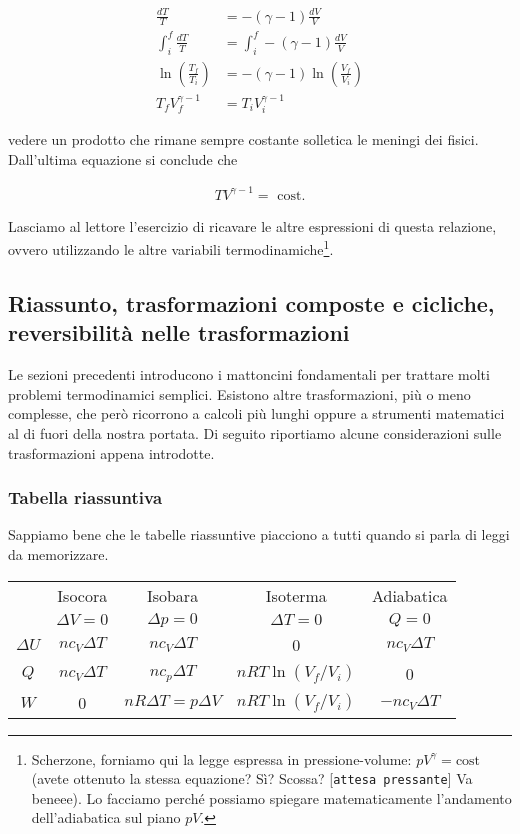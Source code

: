 \begin{align*}
    \frac{dT}{T} &= -(\gamma - 1)\frac{dV}{V}\\
    \int_{i}^{f}\frac{dT}{T} &= \int_{i}^{f}-(\gamma - 1)\frac{dV}{V}\\
    \ln\left(\frac{T_f}{T_i}\right) &= -(\gamma - 1)\ln\left(\frac{V_f}{V_i}\right)\\
    T_fV_f^{\gamma - 1} &= T_iV_i^{\gamma - 1}
\end{align*}

\noindent vedere un prodotto che rimane sempre costante solletica le
meningi dei fisici. Dall'ultima equazione si conclude che

\begin{align}
    TV^{\gamma - 1} = \text{ cost.}\label{lativuu}
\end{align}

\noindent Lasciamo al lettore l'esercizio di ricavare le altre
espressioni di questa relazione, ovvero utilizzando le altre
variabili termodinamiche\footnote{Scherzone, forniamo qui
la legge espressa in pressione-volume: $pV^\gamma = \text{cost}$
(avete ottenuto la stessa equazione? Sì? Scossa? [\texttt{attesa
pressante}] Va beneee). Lo facciamo perché possiamo spiegare
matematicamente l'andamento dell'adiabatica sul piano $pV$.}.

\subsection[Sunto, trasformazioni composte e cicliche, reversibilità]{Riassunto, trasformazioni composte e cicliche, reversibilità nelle trasformazioni}
Le sezioni precedenti introducono i mattoncini fondamentali per
trattare molti problemi termodinamici semplici. Esistono altre
trasformazioni, più o meno complesse, che però ricorrono a
calcoli più lunghi oppure a strumenti matematici al di fuori
della nostra portata.
Di seguito riportiamo alcune considerazioni sulle trasformazioni
appena introdotte.

\subsubsection*{Tabella riassuntiva}
Sappiamo bene che le tabelle riassuntive piacciono a tutti quando
si parla di leggi da memorizzare.

\begin{center}
    \begin{tabular}{c | c | c | c | c}
        & Isocora & Isobara & Isoterma & Adiabatica\\
        & $\Delta V = 0$ & $\Delta p = 0$ & $\Delta T = 0$ & $Q = 0$\\
        \hline
        \hline
        $\Delta U$ & $nc_V\Delta T$ & $nc_V\Delta T$ & 0 & $nc_V\Delta T$\\
        \hline
        $Q$ & $nc_V\Delta T$ & $nc_p\Delta T$ & $nRT\ln(V_f/V_i)$ & 0\\
        \hline
        $W$ & 0 & $nR\Delta T = p\Delta V$ & $nRT\ln(V_f/V_i)$ & $-nc_V\Delta T$
    \end{tabular}
    \label{tabellazza_riassuntazza}
\end{center}

